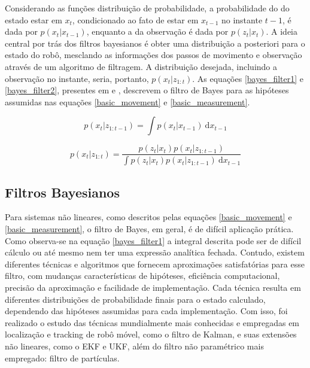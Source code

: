 \documentclass[a4paper,11pt]{article}
\begin{document}
Considerando as funções distribuição de probabilidade, a probabilidade do do estado estar em $x_t$, condicionado ao fato de estar em $x_{t-1}$ no instante $t-1$, é dada por $p(x_t |x_{t-1})$, enquanto a da observação é dada por $p(z_t |x_t)$. A ideia central por trás dos filtros bayesianos é obter uma distribuição a posteriori para o estado do robô, mesclando as informações dos passos de movimento e observação através de um algoritmo de filtragem. A distribuição desejada, incluindo a observação no instante, seria, portanto, $p(x_t |z_{1:t})$. As equações \eqref{bayes_filter1} e \eqref{bayes_filter2}, presentes em \cite{P.Robotics} e \cite{Simo_bayesianFiltering}, descrevem o filtro de Bayes para as hipóteses assumidas nas equações \eqref{basic_movement} e \eqref{basic_measurement}.

\begin{equation}
    \label{bayes_filter1}
    p(x_t|z_{1:t-1})=\int p(x_t|x_{t-1})\: \mathrm{d}x_{t-1}
\end{equation}

\begin{equation}
\label{bayes_filter2}
    p(x_t|z_{1:t})= \frac{p(z_t|x_t)p(x_t|z_{1:t-1})}{\int p(z_t|x_t)p(x_t|z_{1:t-1})\: \mathrm{d}x_{t-1}}
\end{equation}

\subsection{Filtros Bayesianos}

Para sistemas não lineares, como descritos pelas equações \eqref{basic_movement} e \eqref{basic_measurement}, o filtro de Bayes, em geral, é de difícil aplicação prática. Como observa-se na equação \eqref{bayes_filter1} a integral descrita pode ser de difícil cálculo ou até mesmo nem ter uma expressão analítica fechada. Contudo, existem diferentes técnicas e algoritmos que fornecem aproximações satisfatórias para esse filtro, com mudanças características de hipóteses, eficiência computacional, precisão da aproximação e facilidade de implementação. Cada técnica resulta em diferentes distribuições de probabilidade finais para o estado calculado, dependendo das hipóteses assumidas para cada implementação. Com isso, foi realizado o estudo das técnicas mundialmente mais conhecidas e empregadas em localização e tracking de robô móvel, como o filtro de Kalman, e suas extensões não lineares, como o EKF e UKF, além do filtro não paramétrico mais empregado: filtro de partículas.
\end{document}
